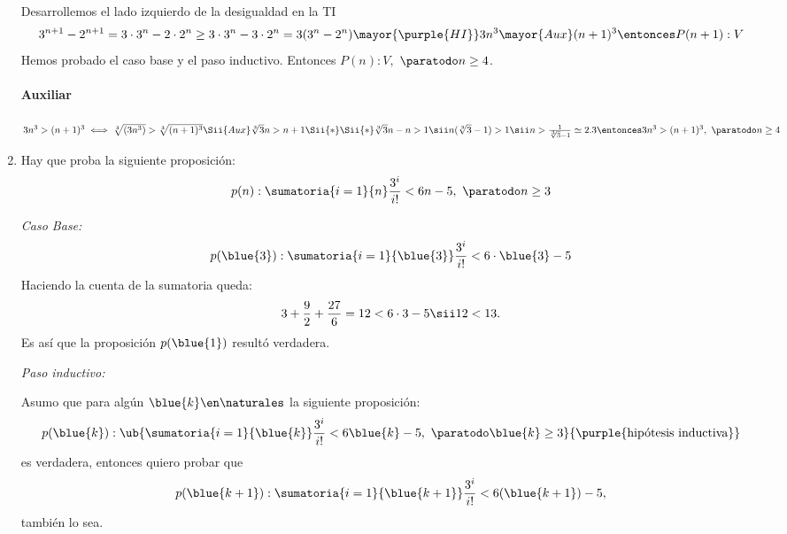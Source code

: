 \begin{enumerate}[label=\roman*)]
        Desarrollemos el lado izquierdo de la desigualdad en la TI
        \begin{align*}
          3^{n+1} - 2^{n+1} = 3 \cdot 3^n - 2 \cdot 2^n \geq 3 \cdot 3^n - 3 \cdot 2^n = 3(3^n - 2^n)
          \mayor{\purple{HI}}
          3n^3
          \mayor{Aux}
          (n+1)^3 \entonces P(n+1):V
        \end{align*}
        Hemos probado el caso base y el paso inductivo. Entonces $P(n):V,$ $\paratodo n \geq 4$.

        \paragraph{Auxiliar}{$3n^3 > (n+1)^3 \iff \sqrt[3]{(3n^3)} > \sqrt[3]{(n+1)^3} \Sii{Aux}
            \sqrt[3]{3}n > n+1 \Sii{*} \\
            \Sii{*} \sqrt[3]{3}n - n > 1 \sii n(\sqrt[3]{3}-1) > 1 \sii n > \frac{1}{\sqrt[3]{3}-1} \simeq 2.3
            \entonces 3n^3 > (n+1)^3, \ \paratodo n \geq 4$}

  \item
        Hay que proba la siguiente proposición:
        $$
          p(n): \sumatoria{i=1}{n} \frac{3^i}{i!} < 6n - 5, ~ \paratodo n \geq 3
        $$

        \textit{Caso Base:}
        $$
          p(\blue{3}):
          \sumatoria{i=1}{\blue{3}} \frac{3^i}{i!} < 6\cdot\blue{3} - 5
        $$
        Haciendo la cuenta de la sumatoria queda:
        $$
          3 + \frac{9}{2} + \frac{27}{6} = 12 < 6 \cdot 3 - 5 \sii 12 < 13.
        $$
        Es así que la proposición $p(\blue{1})$ resultó verdadera.

        \medskip

        \textit{Paso inductivo:}

        Asumo que para algún $\blue{k} \en \naturales$ la siguiente proposición:
        $$
          p(\blue{k}):
          \ub{
            \sumatoria{i=1}{\blue{k}} \frac{3^i}{i!} < 6\blue{k} - 5, ~ \paratodo \blue{k} \geq 3
          }{
            \text{\purple{hipótesis inductiva}}
          }
        $$
        es verdadera, entonces quiero probar que
        $$
          p(\blue{k + 1}): \sumatoria{i=1}{\blue{k + 1}} \frac{3^i}{i!} < 6(\blue{k + 1}) - 5,
        $$
        también lo sea.


\end{enumerate}
